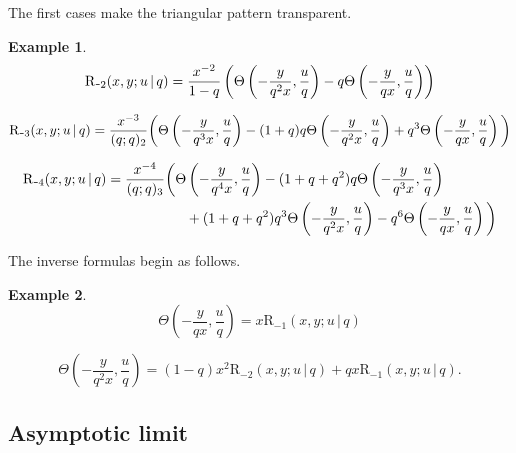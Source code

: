 \documentclass[12pt]{article}
\newcommand{\minus}{\textup{\texttt{-}}}
\newcommand{\rr}{\mathrm{R}}
\newtheorem{example}{Example}
\begin{document}
The first cases make the triangular pattern transparent.
\begin{example}
\[
\rr_{\minus2}(x,y;u\,|\,q)=\frac{x^{-2}}{1-q}\left(\Theta\left(-\frac{y}{q^2x},\frac{u}{q}\right)-q\Theta\left(-\frac{y}{qx},\frac{u}{q}\right)\right)
\]

\[
\rr_{\minus3}(x,y;u\,|\,q)=\frac{x^{-3}}{(q;q)_{2}}\bigg(\Theta\left(-\frac{y}{q^3x},\frac{u}{q}\right)
    -(1+q)q\Theta\left(-\frac{y}{q^2x},\frac{u}{q}\right)+q^3\Theta\left(-\frac{y}{qx},\frac{u}{q}\right)\bigg)
\]

\begin{align*}
    \rr_{\minus4}(x,y;u\,|\,q)&=\frac{x^{-4}}{(q;q)_{3}}\bigg(\Theta\left(-\frac{y}{q^4x},\frac{u}{q}\right)-(1+q+q^2)q\Theta\left(-\frac{y}{q^3x},\frac{u}{q}\right)\\
    &\hspace{2cm}+(1+q+q^2)q^3\Theta\left(-\frac{y}{q^2x},\frac{u}{q}\right)-q^6\Theta\left(-\frac{y}{qx},\frac{u}{q}\right)\bigg)
\end{align*}
\end{example}
The inverse formulas begin as follows.
\begin{example}
\[
\Theta\left(-\frac{y}{qx},\frac{u}{q}\right)=x\rr_{-1}(x,y;u\,|\,q)
\]

\[
\Theta\left(-\frac{y}{q^2x},\frac{u}{q}\right)=(1-q)x^2\rr_{-2}(x,y;u\,|\,q)+qx\rr_{-1}(x,y;u\,|\,q).
\]
    
\end{example}

\subsection{Asymptotic limit}
\end{document}
